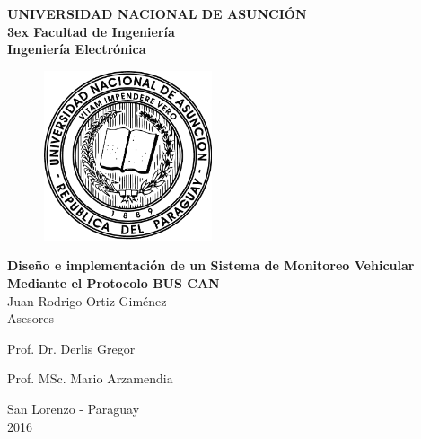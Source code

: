 \pagestyle{empty} %
\begin{center}
\textbf{\LARGE UNIVERSIDAD NACIONAL DE ASUNCIÓN\\
\parskip 3ex
\Large Facultad de Ingeniería\\
\vspace{1ex}
\Large Ingeniería Electrónica\\} 

\vspace{2cm}
\begin{figure}[h]
	\centering
		\includegraphics[height=50mm, width = 50mm]{./imagenes/escudouna.pdf}
	\label{fig:escudouna}
\end{figure}
\vspace{33pt}
\textbf{\large Diseño e implementación de un Sistema de Monitoreo Vehicular Mediante el Protocolo BUS CAN\\}
\vspace{15mm}
Juan Rodrigo Ortiz Giménez \\

\vspace{10mm} %
Asesores

Prof. Dr. Derlis Gregor

Prof. MSc. Mario Arzamendia



San Lorenzo - Paraguay\\
2016
\end{center}